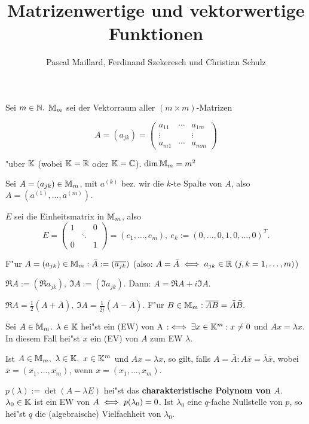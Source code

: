 \documentclass{article}
\title{Matrizenwertige und vektorwertige Funktionen}
\author{Pascal Maillard, Ferdinand Szekeresch und Christian Schulz}
\begin{document}
\maketitle

Sei $m\in\mathbb{N}.$ $\mathbb{M}_m$ sei der Vektorraum aller $(m\times m)$-Matrizen

$$A=(a_{jk}) = \begin{pmatrix}
a_{11} & \cdots & a_{1m}\\
\vdots &        & \vdots\\
a_{m1} & \cdots & a_{mm}
\end{pmatrix}$$

"uber $\mathbb{K}$ (wobei $\mathbb{K}=\mathbb{R}$ oder $\mathbb{K}=\mathbb{C}$). $\dim \mathbb{M}_m = m^2$

Sei $A=(a_{jk})\in\mathbb{M}_m$, mit $a^{(k)}$ bez. wir die $k$-te Spalte von $A$, also $A=(a^{(1)},\ldots,a^{(m)}).$

$E$ sei die Einheitsmatrix in $\mathbb{M}_m$, also
$$E=\begin{pmatrix}
1 &  & 0\\
  & \ddots &\\
0 &  & 1
\end{pmatrix} = (e_1,\ldots,e_m),\ e_k:=(0,\ldots,0,1,0,\ldots,0)^T.$$

F"ur $A=(a_{jk})\in\mathbb{M}_m: \bar{A} := (\overline{a_{jk}})$ (also: $A=\bar{A} \iff a_{jk}\in \mathbb{R}\ (j,k=1,\ldots,m)$)

$\Re A:=(\Re a_{jk}),\ \Im A:=(\Im a_{jk}).$ Dann: $A=\Re A+i\Im A.$

$\Re A = \frac{1}{2}(A+\bar{A}),\ \Im A = \frac{1}{2i}(A-\bar{A}).$ F"ur $B\in\mathbb{M}_m: \overline{AB} = \bar{A}\bar{B}.$

Sei $A\in\mathbb{M}_m$. $\lambda\in\mathbb{K}$ hei"st ein  (EW) von A $:\iff \exists x\in \mathbb{K}^m: x\ne 0$ und $Ax=\lambda x$. In diesem Fall hei"st $x$ ein  (EV) von $A$ zum EW $\lambda$.

Ist $A\in\MdM_m,\ \lambda\in\MdK,\ x\in\MdK^m$ und $Ax=\lambda x$, so gilt, falls $A=\bar{A}: A\overline{x} = \overline{\lambda} \overline{x}$, wobei $\overline{x} = (\overline{x_1},\ldots,\overline{x_m})$, wenn $x=(x_1,\ldots,x_m).$

$p(\lambda):=\det(A-\lambda E)$ hei"st das \textbf{charakteristische Polynom von $A$}. $\lambda_0\in\mathbb{K}$ ist ein EW von $A \iff p(\lambda_0)=0$. Ist $\lambda_0$ eine $q$-fache Nullstelle von $p$, so hei"st $q$ die (algebraische) Vielfachheit von $\lambda_0$.
\end{document}
